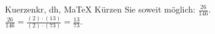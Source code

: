 \begin{MAufgabe}{Kuerzen}{kr, dh, MaTeX}
K\"urzen Sie soweit m\"oglich: $\frac{26}{146}$.\\ 
\ifLsg\MLoesung
\quad $\frac{26}{146}=\frac{(2)\cdot(13)}{(2)\cdot(73)}=\frac{13}{73}$.\else\relax\fi
 \end{MAufgabe}